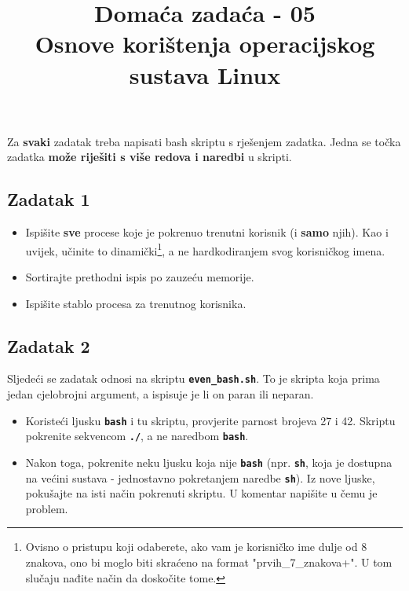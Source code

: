 \documentclass[12pt,a4paper]{article}
\newcommand{\shell}[1]{\texttt{\textbf{#1}}}
\begin{document}
	\title{Domaća zadaća - 05\\{\small Osnove korištenja operacijskog sustava Linux}\vspace{-2em}}
	\maketitle
	Za \textbf{svaki} zadatak treba napisati bash skriptu s rješenjem zadatka. Jedna se točka zadatka \textbf{može riješiti s više redova i naredbi} u skripti. \\
	
	\subsection*{Zadatak 1}
	\begin{itemize}
	    \item Ispišite \textbf{sve} procese koje je pokrenuo trenutni korisnik (i \textbf{samo} njih). Kao i uvijek, učinite to dinamički\footnote{Ovisno o pristupu koji odaberete, ako vam je korisničko ime dulje od 8 znakova, ono bi moglo biti skraćeno na format "prvih\_7\_znakova+". U tom slučaju nađite način da doskočite tome.}, a ne hardkodiranjem svog korisničkog imena.
	    \item Sortirajte prethodni ispis po zauzeću memorije.
	    \item Ispišite stablo procesa za trenutnog korisnika.

	\end{itemize}

	\subsection*{Zadatak 2}
	Sljedeći se zadatak odnosi na skriptu \shell{even\_bash.sh}. To je skripta koja prima jedan cjelobrojni argument, a ispisuje je li on paran ili neparan.
	\begin{itemize}
		\item Koristeći ljusku \shell{bash} i tu skriptu, provjerite parnost brojeva 27 i 42. Skriptu pokrenite sekvencom \shell{./}, a ne naredbom \shell{bash}.
		\item Nakon toga, pokrenite neku ljusku koja nije \shell{bash} (npr. \shell{sh}, koja je dostupna na većini sustava - jednostavno pokretanjem naredbe \shell{sh}). Iz nove ljuske, pokušajte na isti način pokrenuti skriptu. U komentar napišite u čemu je problem.
	\end{itemize}
\end{document}

